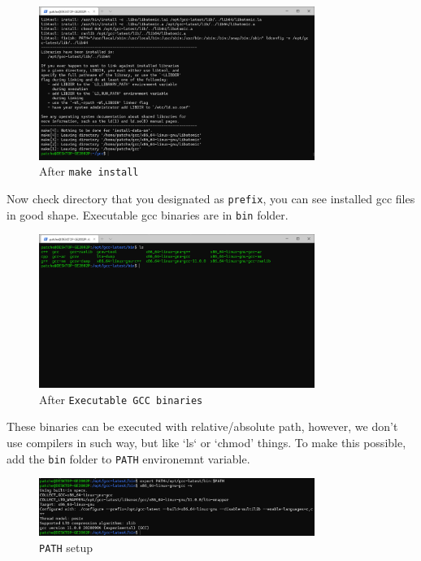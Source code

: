 \documentclass{article}
\begin{document}
\begin{figure}[!htbp]
    \centering
    \includegraphics[width=0.8\textwidth]{images/8.png}
    \caption{After \texttt{make install}}
\end{figure}

Now check directory that you designated as \texttt{prefix}, you can see installed gcc
files in good shape. Executable gcc binaries are in \texttt{bin} folder.

\begin{figure}[!htbp]
    \centering
    \includegraphics[width=0.8\textwidth]{images/9.png}
    \caption{After \texttt{Executable GCC binaries}}
\end{figure}

These binaries can be executed with relative/absolute path, however, we don't use
compilers in such way, but like `ls` or `chmod' things. To make this possible, add the \texttt{bin}
folder to \texttt{PATH} environemnt variable.

\begin{figure}[!htbp]
    \centering
    \includegraphics[width=0.8\textwidth]{images/10.png}
    \caption{\texttt{PATH} setup}
\end{figure}
\end{document}

